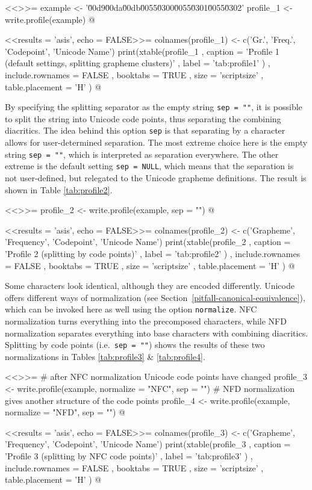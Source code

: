 <<>>=
example <- '\u00d9\u00da\u00db\u0055\u0300\u0055\u0301\u0055\u0302'
profile_1 <- write.profile(example)
@

<<results = 'asis', echo = FALSE>>=
colnames(profile_1) <- c('Gr.', 'Freq.', 'Codepoint', 'Unicode Name')
print(xtable(profile_1
        , caption = 'Profile 1 (default settings, splitting grapheme clusters)'
        , label = 'tab:profile1'
        )
  , include.rownames = FALSE
  , booktabs = TRUE
  , size = 'scriptsize'
  , table.placement = 'H'
  )
@

By specifying the splitting separator as the empty string
\texttt{sep~=~""}, it is possible to split the string into Unicode code points,
thus separating the combining diacritics. The idea behind this option
\texttt{sep} is that separating by a character allows for user-determined
separation. The most extreme choice here is the empty string \texttt{sep~=~""},
which is interpreted as separation everywhere. The other extreme is the default
setting \texttt{sep~=~NULL}, which means that the separation is not
user-defined, but relegated to the Unicode grapheme definitions. The result is 
shown in Table \ref{tab:profile2}.

<<>>=
profile_2 <- write.profile(example, sep = "")
@

<<results = 'asis', echo = FALSE>>=
colnames(profile_2) <- c('Grapheme', 'Frequency', 'Codepoint', 'Unicode Name')
print(xtable(profile_2
        , caption = 'Profile 2 (splitting by code points)'
        , label = 'tab:profile2'
        )
  , include.rownames = FALSE
  , booktabs = TRUE
  , size = 'scriptsize'
  , table.placement = 'H'
  )
@

Some characters look identical, although they are encoded differently.
Unicode offers different ways of normalization (see
Section~\ref{pitfall-canonical-equivalence}), which can be invoked here as well
using the option \texttt{normalize}. NFC normalization turns everything into the
precomposed characters, while NFD normalization separates everything into base
characters with combining diacritics. Splitting by code points (i.e.\ \texttt{sep~=~""}) 
shows the results of these two normalizations in Tables \ref{tab:profile3} \& \ref{tab:profile4}.

<<>>=
# after NFC normalization Unicode code points have changed
profile_3 <- write.profile(example, normalize = "NFC", sep = "")
# NFD normalization gives another structure of the code points
profile_4 <- write.profile(example, normalize = "NFD", sep = "")
@

<<results = 'asis', echo = FALSE>>=
colnames(profile_3) <- c('Grapheme', 'Frequency', 'Codepoint', 'Unicode Name')
print(xtable(profile_3
        , caption = 'Profile 3 (splitting by NFC code points)'
        , label = 'tab:profile3'
        )
  , include.rownames = FALSE
  , booktabs = TRUE
  , size = 'scriptsize'
  , table.placement = 'H'
  )
@

